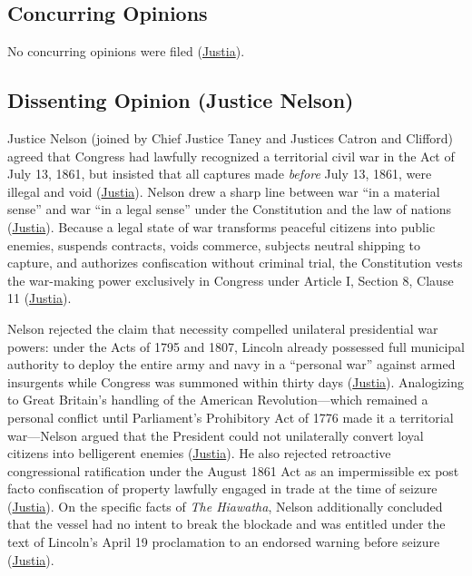 \documentclass[12pt]{article}
\begin{document}
\subsection{Concurring Opinions}

No concurring opinions were filed (\href{https://supreme.justia.com/cases/federal/us/67/635/}{Justia}).

\subsection{Dissenting Opinion (Justice Nelson)}

Justice Nelson (joined by Chief Justice Taney and Justices Catron and Clifford) agreed that Congress had lawfully recognized a territorial civil war in the Act of July 13, 1861, but insisted that all captures made \textit{before} July 13, 1861, were illegal and void (\href{https://supreme.justia.com/cases/federal/us/67/635/}{Justia}). Nelson drew a sharp line between war ``in a material sense'' and war ``in a legal sense'' under the Constitution and the law of nations (\href{https://supreme.justia.com/cases/federal/us/67/635/}{Justia}). Because a legal state of war transforms peaceful citizens into public enemies, suspends contracts, voids commerce, subjects neutral shipping to capture, and authorizes confiscation without criminal trial, the Constitution vests the war-making power exclusively in Congress under Article I, Section 8, Clause 11 (\href{https://supreme.justia.com/cases/federal/us/67/635/}{Justia}).

Nelson rejected the claim that necessity compelled unilateral presidential war powers: under the Acts of 1795 and 1807, Lincoln already possessed full municipal authority to deploy the entire army and navy in a ``personal war'' against armed insurgents while Congress was summoned within thirty days (\href{https://supreme.justia.com/cases/federal/us/67/635/}{Justia}). Analogizing to Great Britain's handling of the American Revolution---which remained a personal conflict until Parliament's Prohibitory Act of 1776 made it a territorial war---Nelson argued that the President could not unilaterally convert loyal citizens into belligerent enemies (\href{https://supreme.justia.com/cases/federal/us/67/635/}{Justia}). He also rejected retroactive congressional ratification under the August 1861 Act as an impermissible ex post facto confiscation of property lawfully engaged in trade at the time of seizure (\href{https://supreme.justia.com/cases/federal/us/67/635/}{Justia}). On the specific facts of \textit{The Hiawatha}, Nelson additionally concluded that the vessel had no intent to break the blockade and was entitled under the text of Lincoln's April 19 proclamation to an endorsed warning before seizure (\href{https://supreme.justia.com/cases/federal/us/67/635/}{Justia}).
\end{document}
